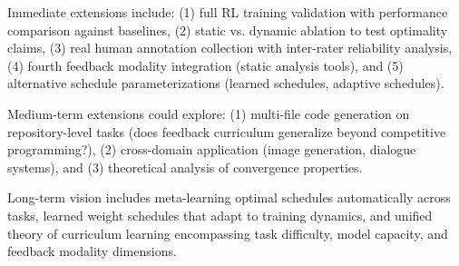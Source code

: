 Immediate extensions include: (1) full RL training validation with performance comparison against baselines, (2) static vs. dynamic ablation to test optimality claims, (3) real human annotation collection with inter-rater reliability analysis, (4) fourth feedback modality integration (static analysis tools), and (5) alternative schedule parameterizations (learned schedules, adaptive schedules).

Medium-term extensions could explore: (1) multi-file code generation on repository-level tasks (does feedback curriculum generalize beyond competitive programming?), (2) cross-domain application (image generation, dialogue systems), and (3) theoretical analysis of convergence properties.

Long-term vision includes meta-learning optimal schedules automatically across tasks, learned weight schedules that adapt to training dynamics, and unified theory of curriculum learning encompassing task difficulty, model capacity, and feedback modality dimensions.
